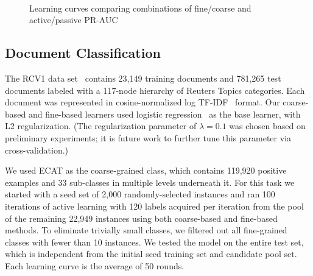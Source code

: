\begin{figure}[tb]
{    	\label{fig:curve-rcv1}
    }\\
    \caption{Learning curves comparing combinations of fine/coarse and active/passive PR-AUC}
  \label{fig:halresults}
\end{figure}

\subsection{Document Classification}
\label{sec:rcv1}

The RCV1 data set~\cite{Lewis2004} contains 23,149 training documents and 781,265 test
documents labeled with a 117-node hierarchy  of Reuters Topics categories. 
Each document was represented in cosine-normalized log TF-IDF~\cite{Salton1988}
format.  Our coarse-based and fine-based learners used logistic regression~\cite{Cox1958} as
the base learner, with L2 regularization. (The regularization parameter of
$\lambda=0.1$ was chosen based on preliminary experiments; it is future work to
further tune this parameter via cross-validation.)

We used ECAT as the coarse-grained class, which contains 119,920
positive examples and 33 sub-classes in multiple levels underneath it.  
For this task we started with a seed set of 2,000 randomly-selected
instances and ran 100 iterations of active learning with 120 labels acquired
per iteration from the pool of the remaining 22,949 instances using both coarse-based and fine-based
methods. To eliminate trivially small classes,
we filtered out all fine-grained classes with fewer than 10 instances.
We tested the model on the entire test set, which is independent from the 
initial seed training set and candidate pool set. Each learning curve is the average of 50 rounds.

